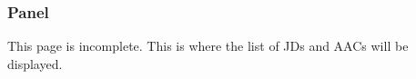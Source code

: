 \subsubsection{Panel}
This page is incomplete. This is where the list of JDs and AACs will be displayed.